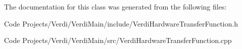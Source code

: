 \-The documentation for this class was generated from the following files\-:\begin{DoxyCompactItemize}
\item 
\-Code Projects/\-Verdi/\-Verdi\-Main/include/\-Verdi\-Hardware\-Transfer\-Function.\-h\item 
\-Code Projects/\-Verdi/\-Verdi\-Main/src/\-Verdi\-Hardware\-Transfer\-Function.\-cpp\end{DoxyCompactItemize}
